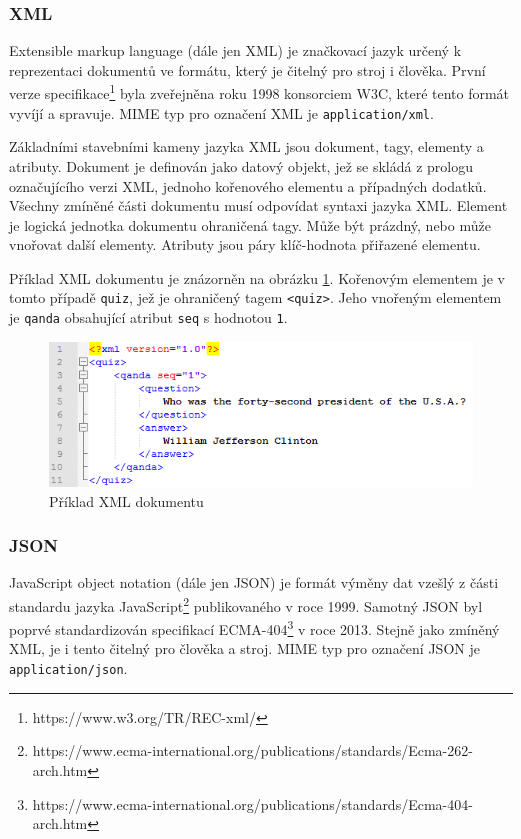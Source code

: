 \documentclass[czech,DP]{thesiskiv}
\begin{document}
\subsubsection{XML}

Extensible markup language (dále jen XML) je značkovací jazyk určený k reprezentaci dokumentů ve formátu, který je čitelný pro stroj i člověka. První verze specifikace\footnote{https://www.w3.org/TR/REC-xml/} byla zveřejněna roku 1998 konsorciem W3C, které tento formát vyvíjí a spravuje. MIME typ pro označení XML je \verb|application/xml|.

Základními stavebními kameny jazyka XML jsou dokument, tagy, elementy a atributy. Dokument je definován jako datový objekt, jež se skládá z prologu označujícího verzi XML, jednoho kořenového elementu a případných dodatků. Všechny zmíněné části dokumentu musí odpovídat syntaxi jazyka XML. Element je logická jednotka dokumentu ohraničená tagy. Může být prázdný, nebo může vnořovat další elementy. Atributy jsou páry klíč-hodnota přiřazené elementu.

Příklad XML dokumentu je znázorněn na obrázku \ref{fig:xml-example}. Kořenovým elementem je v tomto případě \verb|quiz|, jež je ohraničený tagem \verb|<quiz>|. Jeho vnořeným elementem je \verb|qanda| obsahující atribut \verb|seq| s hodnotou \verb|1|.

\begin{figure}[h]
	\centering
	\includegraphics[width=12.5cm]{xml-example.png}
	\caption{Příklad XML dokumentu}
	\label{fig:xml-example}
\end{figure} 

\subsubsection{JSON} 
JavaScript object notation (dále jen JSON) je formát výměny dat vzešlý z části standardu jazyka JavaScript\footnote{https://www.ecma-international.org/publications/standards/Ecma-262-arch.htm} publikovaného v roce 1999. Samotný JSON byl poprvé standardizován specifikací ECMA-404\footnote{https://www.ecma-international.org/publications/standards/Ecma-404-arch.htm} v roce 2013. Stejně jako zmíněný XML, je i tento čitelný pro člověka a stroj.  MIME typ pro označení JSON je \verb|application/json|.
\end{document}
